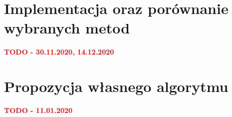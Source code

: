\documentclass[a4paper,12pt,twoside,openany]{report}
\begin{document}
\chapter{Implementacja oraz porównanie wybranych metod}
\textcolor{red}{\textbf{TODO - 30.11.2020, 14.12.2020}}


\chapter{Propozycja własnego algorytmu}
\textcolor{red}{\textbf{TODO - 11.01.2020}}



\end{document}
